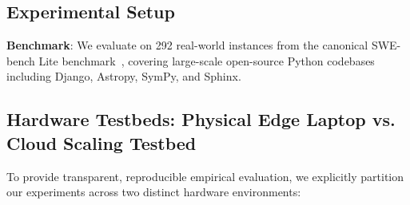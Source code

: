 \documentclass[journal]{IEEEtran}
\begin{document}
\subsection{Experimental Setup}

\textbf{Benchmark}: We evaluate on 292 real-world instances from the canonical SWE-bench Lite benchmark~\cite{jimenez2024swebench}, covering large-scale open-source Python codebases including Django, Astropy, SymPy, and Sphinx.

\subsection{Hardware Testbeds: Physical Edge Laptop vs. Cloud Scaling Testbed}
\label{sec:testbeds}

To provide transparent, reproducible empirical evaluation, we explicitly partition our experiments across two distinct hardware environments:
\end{document}
